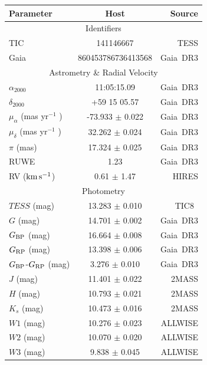\documentclass{nature3}
\newcommand{\kms}{\ensuremath{\rm km\,s^{-1}}}
\begin{document}
\begin{methods}
\begin{table}
    \centering
    \begin{tabular}{lcr}
    \hline 
    \hline
    Parameter & Host & Source \\
    \hline 
    \multicolumn{3}{c}{Identifiers} \\
    \hline
    TIC & 141146667 & TESS \\
    Gaia & 860453786736413568 & Gaia\ DR3 \\
    \hline
    \multicolumn{3}{c}{Astrometry \& Radial Velocity} \\ 
    \hline
    $\alpha_{2000}$ & 11:05:15.09   & Gaia\ DR3 \\
    $\delta_{2000}$ & +59 15 05.57  & Gaia\ DR3 \\
    $\mu_{\alpha}$ (mas yr$^{-1}$ ) & -73.933 $\pm$ 0.022 & Gaia\ DR3 \\
    $\mu_{\delta}$ (mas yr$^{-1}$ ) &  32.262 $\pm$ 0.024 & Gaia\ DR3 \\
    $\pi$ (mas)                     &  17.324 $\pm$ 0.025 & Gaia\ DR3 \\
    RUWE                            &  1.23               & Gaia\ DR3 \\
    RV (\kms)                       & 0.61 $\pm$ 1.47     & HIRES \\
    \hline
    \multicolumn{3}{c}{Photometry} \\
    \hline
    $TESS$ (mag)                    & 13.283 $\pm$ 0.010 & TIC8\     \\
    $G$ (mag)                       & 14.701 $\pm$ 0.002 & Gaia\ DR3 \\
    $G_{\rm BP}$ (mag)              & 16.664 $\pm$ 0.008 & Gaia\ DR3 \\
    $G_{\rm RP}$ (mag)              & 13.398 $\pm$ 0.006 & Gaia\ DR3 \\
    $G_{\rm BP}$-$G_{\rm RP}$ (mag) &  3.276 $\pm$ 0.010 & Gaia\ DR3 \\
    $J$ (mag)                       & 11.401 $\pm$ 0.022 & 2MASS     \\
    $H$ (mag)                       & 10.793 $\pm$ 0.021 & 2MASS     \\
    $K_s$ (mag)                     & 10.473 $\pm$ 0.016 & 2MASS     \\
    $W1$ (mag)                      & 10.276 $\pm$ 0.023 & ALLWISE   \\ %
    $W2$ (mag)                      & 10.070 $\pm$ 0.020 & ALLWISE   \\
    $W3$ (mag)                      &  9.838 $\pm$ 0.045 & ALLWISE   \\

\end{tabular}
\end{table}
\end{methods}
\end{document}
